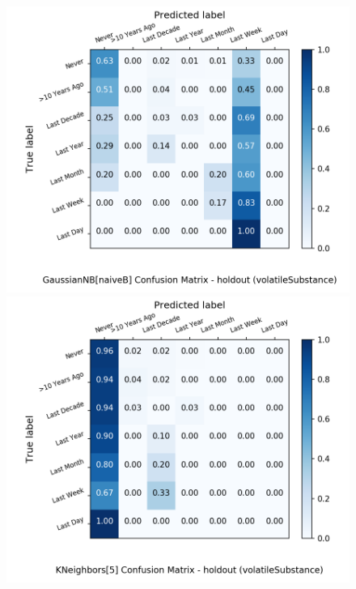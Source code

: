 \begin{figure}[H]
	\begin{minipage}[b]{0.32\textwidth}
		\includegraphics[width=1.1\textwidth]{Plots/volatileSubstance_GaussianNB_naiveB_balance_False_holdout.png}
	\end{minipage}
	\begin{minipage}[b]{0.32\textwidth}
		\includegraphics[width=1.1\textwidth]{Plots/volatileSubstance_KNeighbors_5_balance_False_holdout.png}
  \end{minipage}
	\begin{minipage}[b]{0.32\textwidth}

\end{minipage}
\end{figure}
